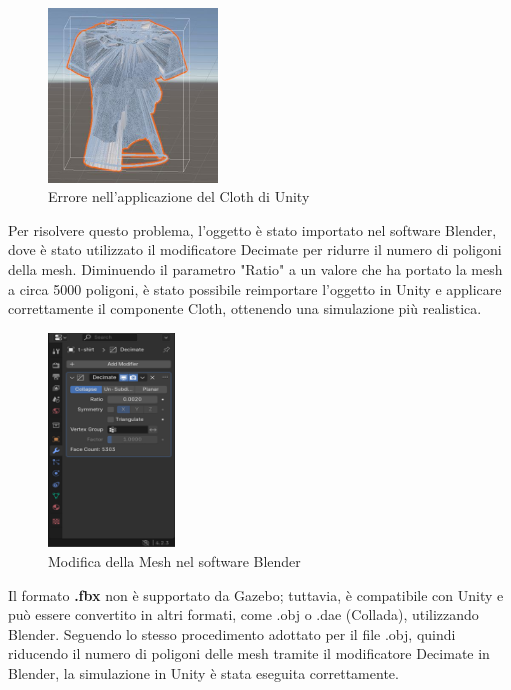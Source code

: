 \documentclass[11pt]{report}
\begin{document}
\begin{figure}[h!]
    \centering
    \includegraphics[width=0.4\textwidth]{images/cloth_error.PNG}
    \caption{Errore nell'applicazione del Cloth di Unity}
    \label{fig:cloth_error}
\end{figure}

Per risolvere questo problema, l'oggetto è stato importato nel software Blender, dove è stato utilizzato il modificatore Decimate per ridurre il numero di poligoni della mesh. Diminuendo il parametro "Ratio" a un valore che ha portato la mesh a circa 5000 poligoni, è stato possibile reimportare l'oggetto in Unity e applicare correttamente il componente Cloth, ottenendo una simulazione più realistica.

\begin{figure}[h!]
    \centering
    \includegraphics[width=0.3\textwidth]{images/blender_ratio.PNG}
    \caption{Modifica della Mesh nel software Blender}
    \label{fig:blender_ratio}
\end{figure}

Il formato \textbf{.fbx} non è supportato da Gazebo; tuttavia, è compatibile con Unity e può essere convertito in altri formati, come .obj o .dae (Collada), utilizzando Blender. Seguendo lo stesso procedimento adottato per il file .obj, quindi riducendo il numero di poligoni delle mesh tramite il modificatore Decimate in Blender, la simulazione in Unity è stata eseguita correttamente.
\end{document}
